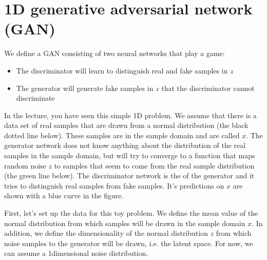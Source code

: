 \documentclass[letterpaper,10pt,english]{jupyterBook}
\begin{document}
\section{1D generative adversarial network (GAN)}
\label{\detokenize{notebooks/Tutorial4_Generative_Models/Tutorial4_Generative_Models_student:d-generative-adversarial-network-gan}}
\sphinxAtStartPar
We define a GAN consisting of two neural networks that play a game:
\begin{itemize}
\item {} 
\sphinxAtStartPar
The discriminator will learn to distinguish real and fake samples in \(z\)

\item {} 
\sphinxAtStartPar
The generator will generate fake samples in \(z\) that the discriminator cannot discriminate

\end{itemize}

\sphinxAtStartPar
In the lecture, you have seen this simple 1D problem. We assume that there is a data set of real samples that are drawn from a normal distribution (the black dotted line below). These samples are in the sample domain and are called \(x\). The generator network does not know anything about the distribution of the real samples in the sample domain, but will try to converge to a function that maps random noise \(z\) to samples that seem to come from the real sample distribution (the green line below). The discriminator network is the  of the generator and it tries to distinguish real samples from fake samples. It’s predictions on \(x\) are shown with a blue curve in the figure.



\sphinxAtStartPar
First, let’s set up the data for this toy problem. We define the mean value of the normal distribution from which  samples will be drawn in the sample domain \(x\). In addition, we define the dimensionality of the normal distribution \(z\) from which noise samples to the generator will be drawn, i.e. the latent space. For now, we can assume a 1\sphinxhyphen{}dimensional noise distribution.
\end{document}
